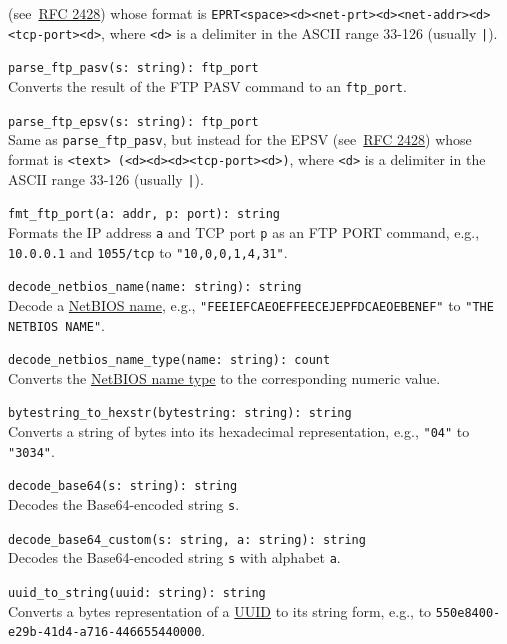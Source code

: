 \documentclass[10pt,landscape]{article}
\begin{document}
\begin{multicols*}{2}
\begin{itemize}
{    (see~\href{http://tools.ietf.org/html/rfc2428}{RFC 2428}) whose format is
    \verb|EPRT<space><d><net-prt><d><net-addr><d><tcp-port><d>|, where
    \verb|<d>| is a delimiter in the ASCII range 33-126 (usually \verb#|#).
  \item \verb|parse_ftp_pasv(s: string): ftp_port|\\
    Converts the result of the FTP PASV command to an \verb|ftp_port|.
  \item \verb|parse_ftp_epsv(s: string): ftp_port|\\
    Same as \verb|parse_ftp_pasv|, but instead for the EPSV
    (see~\href{http://tools.ietf.org/html/rfc2428}{RFC 2428}) whose format is
    \verb|<text> (<d><d><d><tcp-port><d>)|, where \verb|<d>| is a delimiter in
    the ASCII range 33-126 (usually \verb#|#).
  \item \verb|fmt_ftp_port(a: addr, p: port): string|\\
    Formats the IP address \texttt{a} and TCP port \texttt{p} as an FTP
    PORT command, e.g., \verb|10.0.0.1| and \verb|1055/tcp| to
    \verb|"10,0,0,1,4,31"|.
  \item \verb|decode_netbios_name(name: string): string|\\
    Decode a \href{http://support.microsoft.com/kb/194203}{NetBIOS name}, e.g.,
    \verb|"FEEIEFCAEOEFFEECEJEPFDCAEOEBENEF"| to \verb|"THE NETBIOS NAME"|.
  \item \verb|decode_netbios_name_type(name: string): count|\\
    Converts the \href{http://support.microsoft.com/kb/163409}{NetBIOS name
    type} to the corresponding numeric value.
}
  \item \verb|bytestring_to_hexstr(bytestring: string): string|\\
    Converts a string of bytes into its hexadecimal representation, e.g.,
    \verb|"04"| to \verb|"3034"|.
  \item \verb|decode_base64(s: string): string|\\
    Decodes the Base64-encoded string \verb|s|.
  \item \verb|decode_base64_custom(s: string, a: string): string|\\
    Decodes the Base64-encoded string \verb|s| with alphabet \verb|a|.
  \item \verb|uuid_to_string(uuid: string): string|\\
    Converts a bytes representation of a
    \href{http://en.wikipedia.org/wiki/Universally_unique_identifier}{UUID} to
    its string form, e.g., to \verb|550e8400-e29b-41d4-a716-446655440000|.

\end{itemize}
\end{multicols*}
\end{document}
